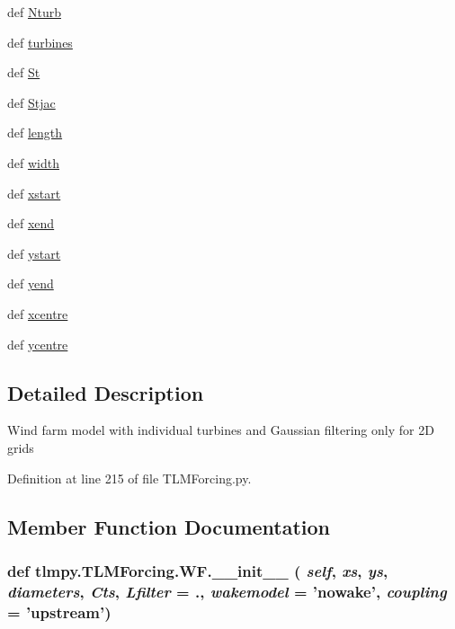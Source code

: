 \begin{DoxyCompactItemize}
\item 
def \hyperlink{classtlmpy_1_1TLMForcing_1_1WF_a7768bf66115d54e36ea0e0a81ca55aca}{Nturb}
\item 
def \hyperlink{classtlmpy_1_1TLMForcing_1_1WF_a38d2d9d59ab1e05c7be26a14a5177552}{turbines}
\item 
def \hyperlink{classtlmpy_1_1TLMForcing_1_1WF_a0f90383fde87421cf03fe3aba6fc8375}{St}
\item 
def \hyperlink{classtlmpy_1_1TLMForcing_1_1WF_a2790abe7cdb78755d03e3c4117b78cfc}{Stjac}
\item 
def \hyperlink{classtlmpy_1_1TLMForcing_1_1WF_ae0772c24f6c9bc4d3219e3e9a2381c2a}{length}
\item 
def \hyperlink{classtlmpy_1_1TLMForcing_1_1WF_a04be28e8498f924b11ea9c18c04e4801}{width}
\item 
def \hyperlink{classtlmpy_1_1TLMForcing_1_1WF_a62c10f4c2b5072b95dada14dec8fa8ad}{xstart}
\item 
def \hyperlink{classtlmpy_1_1TLMForcing_1_1WF_ade8a3c331235286ffd9642428997a110}{xend}
\item 
def \hyperlink{classtlmpy_1_1TLMForcing_1_1WF_ad7292617ec6a1d86fd42a5b57d708f9f}{ystart}
\item 
def \hyperlink{classtlmpy_1_1TLMForcing_1_1WF_a317f0e822dd3b3cfa231aa31c1aa41e6}{yend}
\item 
def \hyperlink{classtlmpy_1_1TLMForcing_1_1WF_aeab637f60512c6a3f3343896e09790b0}{xcentre}
\item 
def \hyperlink{classtlmpy_1_1TLMForcing_1_1WF_aa669d1fa2a8fae06f5cb698ad30a9015}{ycentre}
\end{DoxyCompactItemize}


\subsection{Detailed Description}
\begin{DoxyVerb}
Wind farm model with individual turbines and Gaussian filtering
only for 2D grids
\end{DoxyVerb}
 

Definition at line 215 of file TLMForcing.py.

\subsection{Member Function Documentation}
\hypertarget{classtlmpy_1_1TLMForcing_1_1WF_a3260ed340bbdd902b712405a0f15371d}{
\subsubsection[{\_\-\_\-init\_\-\_\-}]{\setlength{\rightskip}{0pt plus 5cm}def tlmpy.TLMForcing.WF.\_\-\_\-init\_\-\_\- ( {\em self}, \/   {\em xs}, \/   {\em ys}, \/   {\em diameters}, \/   {\em Cts}, \/   {\em Lfilter} = {.}, \/   {\em wakemodel} = {\ttfamily 'nowake'}, \/   {\em coupling} = {\ttfamily 'upstream'})}}
\label{classtlmpy_1_1TLMForcing_1_1WF_a3260ed340bbdd902b712405a0f15371d}


